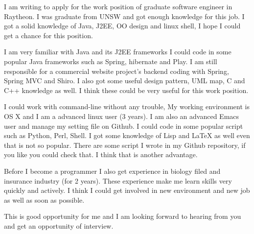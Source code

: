 \documentclass[10pt,stdletter,dateno,sigleft]{newlfm} %
\begin{document}
\begin{newlfm}



  I am writing to apply for the work position of graduate software engineer in Raytheon. I was graduate from UNSW and got enough knowledge for this job. I got a solid knowledge of Java, J2EE, OO design and linux shell, I hope I could get a chance for this position.

  I am very familiar with Java and its J2EE frameworks I could code in some popular Java frameworks such as Spring, hibernate and Play. I am still responsible for a commercial website project's backend coding with Spring, Spring MVC and Shiro. I also got some useful design pattern, UML map, C and C++ knowledge as well. I think these could be very useful for this work position.

  I could work with command-line without any trouble, My working environment is OS X and I am a advanced linux user (3 years). I am also an advanced Emacs user and manage my setting file on Github. I could code in some popular script such as Python, Perl, Shell. I got some knowledge of Lisp and {\LaTeX}  as well even that is not so popular. There are some script I wrote in my Github repository, if you like you could check that. I think that is another advantage.

  Before I become a programmer I also get experience in biology filed and insurance industry (for 2 years).  These experience make me learn skills very quickly and actively. I think I could  get involved in new environment and new job as well as soon as possible.

  This is good opportunity for me and I am looking forward to hearing from you and get an opportunity of interview.




\end{newlfm}
\end{document}
